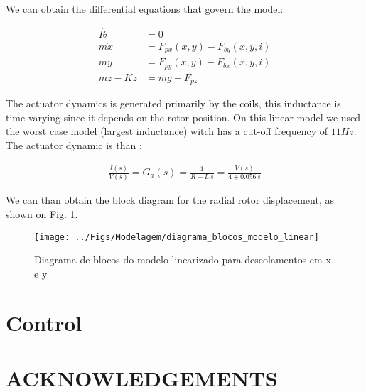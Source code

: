 \documentclass[10pt,fleqn,a4paper,twoside]{article}
\begin{document}
	We can obtain the differential equations that govern the model:
	
	
	\begin{align}
		I \ddot{\theta} &= 0 \\
		m \ddot{x}		&=  F_{px}(x,y) - F_{by}(x,y,i) \\
		m \ddot{y}		&=  F_{py}(x,y) - F_{bx}(x,y,i)\\	
		m \ddot{z} - K z &= m g  + F_{pz}
	\end{align}
	
	
	The actuator dynamics is generated primarily by the coils,  this inductance is time-varying since it depends on the rotor position. On this linear model we used the worst case model (largest inductance) witch has a cut-off frequency of $11Hz$. The actuator dynamic is than :
	
	\begin{align}
		\frac{I(s)}{V(s)} = G_a(s) = \frac{1}{R + L \, s} = \frac{V(s)}{4 + 0.056 \, s}
	\end{align}
	
	We can than obtain the block diagram for the radial rotor displacement, as shown on Fig. \ref{fig:diagrama:blocos:modelo:linear}.
	
	\begin{figure}[th!]
		\centering
		\texttt{[image: ../Figs/Modelagem/diagrama\_blocos\_modelo\_linear]}
		\caption{Diagrama de blocos do modelo linearizado para descolamentos em x e y}
		\label{fig:diagrama:blocos:modelo:linear}
	\end{figure}
	
	\section{Control}
	
	\section{ACKNOWLEDGEMENTS}
	
\end{document}
